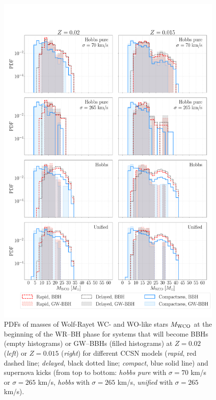 \documentclass[a4paper,titlepage]{book}     	%
\begin{document}
\begin{appendices}
\begin{figure}
	\centering
	\includegraphics[width=\textwidth]{./images/WRBH-MWRpureHe.pdf}	
	\caption{PDFs of masses of Wolf-Rayet WC- and WO-like stars $M_{\rm WCO}$ at the beginning of the WR--BH phase for systems that will become BBHs (empty histograms) or GW--BBHs (filled histograms) at $Z=0.02$ (\emph{left}) or $Z=0.015$ (\emph{right}) for different CCSN models (\emph{rapid}, red dashed line; \emph{delayed}, black dotted line; \emph{compact}, blue solid line) and supernova kicks (from top to bottom: \emph{hobbs pure} with $\sigma = 70$ km/s or $\sigma = 265$ km/s, \emph{hobbs} with $\sigma = 265$ km/s, \emph{unified} with $\sigma = 265$ km/s).}\label{fig:resultsWRBH-MWRpureHe}
\end{figure}


\end{appendices}
\end{document}
